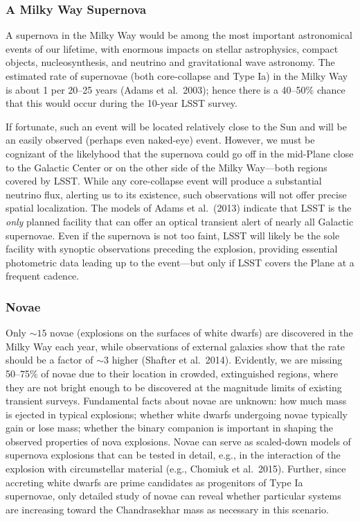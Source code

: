 \subsubsection{A Milky Way Supernova}

A supernova in the Milky Way would be among the most important astronomical events of our lifetime, with enormous impacts on stellar astrophysics, compact 
objects, nucleosynthesis, and neutrino and gravitational wave astronomy. The estimated rate of supernovae (both core-collapse and Type Ia) in the Milky Way 
is about 1 per 20--25 years (Adams et al.~2003); hence there is a 40--50\% chance that this would occur during the 10-year LSST survey.

If fortunate, such an event will be located relatively close to the Sun and will be an easily observed (perhaps even naked-eye) event. However, we must be 
cognizant of the likelyhood that the supernova could go off in the mid-Plane close to the Galactic Center or on the other side of the Milky Way---both 
regions covered by LSST. While any core-collapse event will produce a substantial neutrino flux, alerting us to its existence, such observations will not 
offer precise spatial localization. The models of Adams et al.~(2013) indicate that LSST is the \emph{only} planned facility that can offer an optical 
transient alert of nearly all Galactic supernovae. Even if the supernova is not too faint, LSST will likely be the sole facility with synoptic observations 
preceding the explosion, providing essential photometric data leading up to the event---but only if LSST covers the Plane at a frequent cadence.


\subsubsection{Novae}

Only $\sim 15$ novae (explosions on the surfaces of white dwarfs) are discovered in the Milky Way each year, while observations of external galaxies show 
that the rate should be a factor of $\sim 3$ higher (Shafter et al.~2014). Evidently, we are missing 50--75\% of novae due to their location in crowded, 
extinguished regions, where they are not bright enough to be discovered at the magnitude limits of existing transient surveys. Fundamental facts about novae 
are unknown: how much mass is ejected in typical explosions; whether white dwarfs undergoing novae typically gain or lose mass; whether the binary companion 
is important in shaping the observed properties of nova explosions. Novae can serve as scaled-down models of supernova explosions that can be tested in 
detail, e.g., in the interaction of the explosion with circumstellar material (e.g., Chomiuk et al.~2015). Further, since accreting white dwarfs are prime 
candidates as progenitors of Type Ia supernovae, only detailed study of novae can reveal whether particular systems are increasing toward the Chandrasekhar 
mass as necessary in this scenario.

